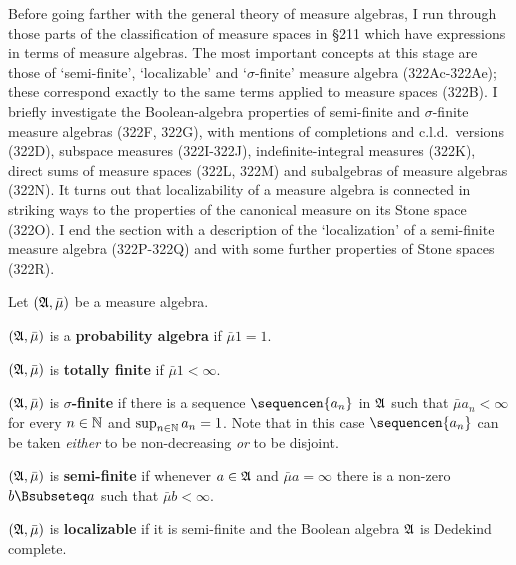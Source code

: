 
\def\chaptername{Measure algebras}
\def\sectionname{Taxonomy of measure algebras}


Before going farther with the general theory of measure algebras, I run
through those parts of the classification of measure spaces in \S211
which have expressions in terms of measure algebras.   The most
important concepts at this stage are those of `semi-finite',
`localizable' and
`$\sigma$-finite' measure algebra (322Ac-322Ae);  these correspond
exactly to the same terms applied to measure spaces (322B).   I briefly
investigate the Boolean-algebra properties of
semi-finite and $\sigma$-finite measure algebras (322F, 322G), with
mentions of completions and c.l.d.\ versions (322D), subspace measures
(322I-322J), indefinite-integral measures (322K),
direct sums of measure spaces (322L, 322M) and
subalgebras of measure algebras (322N).   It turns out that
localizability
of a measure algebra is connected in striking ways to the properties of
the canonical measure on its Stone space (322O).   I end the section
with a description of the `localization' of a
semi-finite measure algebra (322P-322Q) and with some further properties
of Stone spaces (322R).

 Let $(\frak A,\bar\mu)$ be a measure
algebra.

 $(\frak A,\bar\mu)$ is
a {\bf probability algebra} if $\bar\mu 1=1$.

 $(\frak A,\bar\mu)$ is {\bf
totally finite} if $\bar\mu 1<\infty$.

 $(\frak A,\bar\mu)$ is
{\bf $\sigma$-finite} if there is a sequence $\sequencen{a_n}$ in
$\frak A$ such that $\bar\mu a_n<\infty$ for every $n\in\Bbb N$ and
$\sup_{n\in\Bbb N}a_n=1$.   Note that in this case $\sequencen{a_n}$ can be taken {\it either} to be non-decreasing
{\it or} to be disjoint.

 $(\frak A,\bar\mu)$ is
{\bf semi-finite} if whenever $a\in\frak A$ and $\bar\mu a=\infty$ there
is a non-zero $b\Bsubseteq a$ such that $\bar\mu b<\infty$.

 $(\frak A,\bar\mu)$ is {\bf
localizable} if it is semi-finite and the Boolean
algebra $\frak A$ is Dedekind complete.

